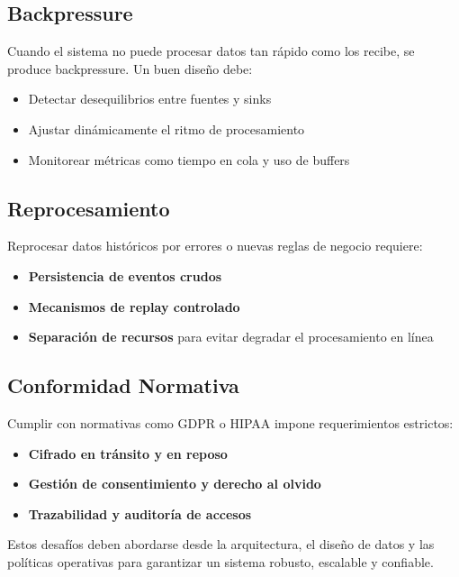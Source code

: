 \subsection{Backpressure}
Cuando el sistema no puede procesar datos tan rápido como los recibe, se produce backpressure. Un buen diseño debe:
\begin{itemize}
    \item Detectar desequilibrios entre fuentes y sinks
    \item Ajustar dinámicamente el ritmo de procesamiento
    \item Monitorear métricas como tiempo en cola y uso de buffers
\end{itemize}

\subsection{Reprocesamiento}
Reprocesar datos históricos por errores o nuevas reglas de negocio requiere:
\begin{itemize}
    \item \textbf{Persistencia de eventos crudos}
    \item \textbf{Mecanismos de replay controlado}
    \item \textbf{Separación de recursos} para evitar degradar el procesamiento en línea
\end{itemize}

\subsection{Conformidad Normativa}
Cumplir con normativas como GDPR o HIPAA impone requerimientos estrictos:
\begin{itemize}
    \item \textbf{Cifrado en tránsito y en reposo}
    \item \textbf{Gestión de consentimiento y derecho al olvido}
    \item \textbf{Trazabilidad y auditoría de accesos}
\end{itemize}

\medskip
Estos desafíos deben abordarse desde la arquitectura, el diseño de datos y las políticas operativas para garantizar un sistema robusto, escalable y confiable.

\newpage